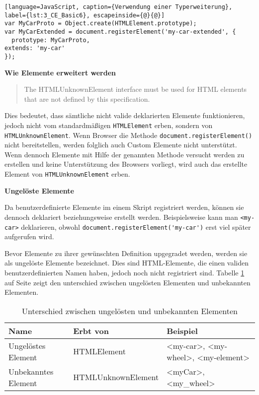 \begin{lstlisting}[language=JavaScript, caption={Verwendung einer Typerweiterung}, label={lst:3_CE_Basic6}, escapeinside={@}{@}]
var MyCarProto = Object.create(HTMLElement.prototype);
var MyCarExtended = document.registerElement('my-car-extended', {
  prototype: MyCarProto,
extends: 'my-car'
});
\end{lstlisting}

\textbf{Wie Elemente erweitert werden}

\begin{quote}
\glqq The HTMLUnknownElement interface must be used for HTML elements that are not defined by this specification.\grqq
\end{quote}
Dies bedeutet, dass sämtliche nicht valide deklarierten Elemente funktionieren, jedoch nicht vom standardmäßigen \lstinline|HTMLElement| erben, sondern von \lstinline|HTMLUnknownElement|. Wenn Browser die Methode \lstinline|document.registerElement()| nicht bereitstellen, werden folglich auch Custom Elemente nicht unterstützt. Wenn dennoch Elemente mit Hilfe der genannten Methode versucht werden zu erstellen und keine Unterstützung des Browsers vorliegt, wird auch das erstellte Element von \lstinline|HTMLUnknownElement| erben.

\textbf{Ungelöste Elemente}

Da benutzerdefinierte Elemente im einem Skript registriert werden, können sie dennoch deklariert beziehungsweise erstellt werden. Beispielsweise kann man \lstinline|<my-car>| deklarieren, obwohl \lstinline|document.registerElement('my-car')| erst viel später aufgerufen wird.

Bevor Elemente zu ihrer gewünschten Definition upgegradet werden, werden sie als ungelöste Elemente bezeichnet. Dies sind HTML-Elemente, die einen validen benutzerdefinierten Namen haben, jedoch noch nicht registriert sind. Tabelle \ref{tab:Unterschiede_Elemente} auf Seite \pageref{tab:Unterschiede_Elemente} zeigt den unterschied zwischen ungelösten Elementen und unbekannten Elementen.


\begin{table}[h]
\centering
\begin{tabular}{ p{3cm} | p{5cm} | p{5cm} }
Name & Erbt von & Beispiel \\
\hline
\hline
Ungelöstes Element & HTMLElement & <my-car>, <my-wheel>, <my-element>\\
\hline
Unbekanntes Element & HTMLUnknownElement & <myCar>, <my\_wheel>\\
\end{tabular}
\caption[
Unterschied zwischen ungelösten und unbekannten Elementen
]
{Unterschied zwischen ungelösten und unbekannten Elementen}
\label{tab:Unterschiede_Elemente}
\end{table}

